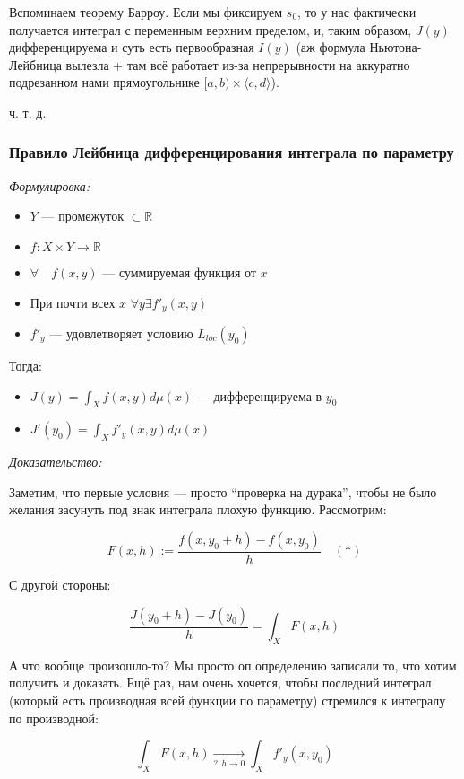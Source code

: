 \documentclass{article}
\def\dbl{\,\,}
\def\goesto#1{\underset{#1}{\longrightarrow}}
\begin{document}
Вспоминаем теорему Барроу. Если мы фиксируем $s_0$, то у нас фактически получается интеграл с переменным верхним пределом, и, таким образом, $J(y)$ дифференцируема и суть есть первообразная $I(y)$ (аж формула Ньютона-Лейбница вылезла + там всё работает из-за непрерывности на аккуратно подрезанном нами прямоугольнике $[a, b) \times \langle c, d \rangle$).

ч. т. д. 


\subsubsection{Правило Лейбница дифференцирования интеграла по параметру}
\textit{Формулировка:}

\begin{itemize}
    \item $Y$ --- промежуток $\subset \mathbb{R}$
    \item $f: X \times Y \rightarrow \mathbb{R}$
    \item $\forall \quad f(x, y)$ --- суммируемая функция от $x$
    \item При почти всех $x \dbl \forall y \exists f'_y(x, y)$
    \item $f'_y$ --- удовлетворяет условию $L_{loc}(y_0)$
\end{itemize}

Тогда:

\begin{itemize}
    \item $J(y) = \int_{X} f(x, y) d\mu(x)$ --- дифференцируема в $y_0$
    \item $J'(y_0) = \int_{X} f'_y(x, y) d \mu(x)$
\end{itemize}

\textit{Доказательство:}

Заметим, что первые условия --- просто ``проверка на дурака'', чтобы не было желания засунуть под знак интеграла плохую функцию. Рассмотрим:

\[F(x, h) := \frac{f(x, y_0 + h) - f(x, y_0)}{h} \quad (*)\]

С другой стороны:

\[\frac{J(y_0 + h) - J(y_0)}{h} = \int_{X} F(x, h)\]

А что вообще произошло-то? Мы просто оп определению записали то, что хотим получить и доказать. Ещё раз, нам очень хочется, чтобы последний интеграл (который есть производная всей функции по параметру) стремился к интегралу по производной:

\[\int_{X} F(x, h) \goesto{?, h \rightarrow 0} \int_{X} f'_y(x, y_0)\]
\end{document}
